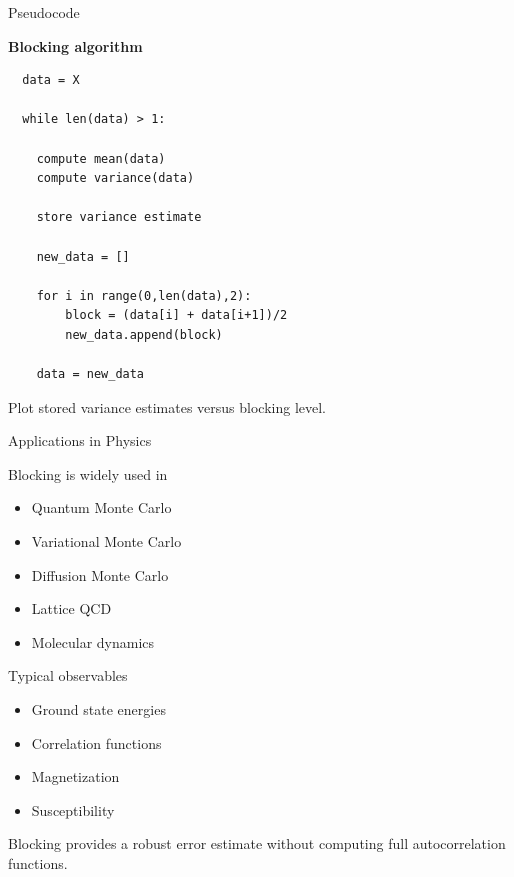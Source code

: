 \documentclass{beamer}
\begin{document}
\begin{frame}{Pseudocode}

  \textbf{Blocking algorithm}

\begin{verbatim}
  data = X

  while len(data) > 1:

    compute mean(data)
    compute variance(data)

    store variance estimate

    new_data = []

    for i in range(0,len(data),2):
        block = (data[i] + data[i+1])/2
        new_data.append(block)

    data = new_data
\end{verbatim}

Plot stored variance estimates versus blocking level.
\end{frame}


\begin{frame}{Applications in Physics}

  Blocking is widely used in

  \begin{itemize}

  \item Quantum Monte Carlo
  \item Variational Monte Carlo
  \item Diffusion Monte Carlo
  \item Lattice QCD
  \item Molecular dynamics

  \end{itemize}

  Typical observables

  \begin{itemize}

  \item Ground state energies
  \item Correlation functions
  \item Magnetization
  \item Susceptibility

  \end{itemize}

  Blocking provides a robust error estimate without computing full autocorrelation functions.
\end{frame}

\end{document}
